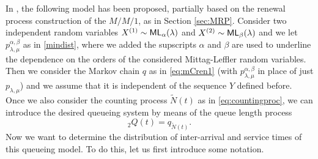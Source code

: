 \documentclass[]{amsart}
\numberwithin{equation}{section}
\theoremstyle{remark}
\theoremstyle{definition}
\DeclareMathOperator{\bP}{\mathbb{P}}
\begin{document}
In \cite{butt2023queuing}, the following model has been proposed, {partially based on the renewal process construction of the $M/M/1$, as in Section \ref{sec:MRP}}. Consider two independent random variables $X^{(1)} \sim {\sf ML}_\alpha(\lambda)$ and $X^{(2)} \sim {\sf ML}_\beta(\lambda)$ {and we let $p_{\lambda,\mu}^{\alpha,\beta}$ as in \eqref{mindist}, where we added the supscripts $\alpha$ and $\beta$ are used to underline the dependence on the orders of the considered Mittag-Leffler random variables. Then we consider the Markov chain $q$ as in \eqref{eq:mCren1} (with $p_{\lambda,\mu}^{\alpha,\beta}$ in place of just $p_{\lambda,\mu}$) and we assume that it is independent of the sequence $Y$ defined before. Once we also consider the counting process $\widetilde{N}(t)$ as in \eqref{eq:countingproc}, we can introduce the desired queueing system by means of the queue length process
\begin{equation*}
	{}_2Q(t)=q_{\widetilde{N}(t)}.
\end{equation*}}
Now we want to determine the distribution of inter-arrival and service times of this queueing model. To do this, let us first introduce some notation.
\end{document}
